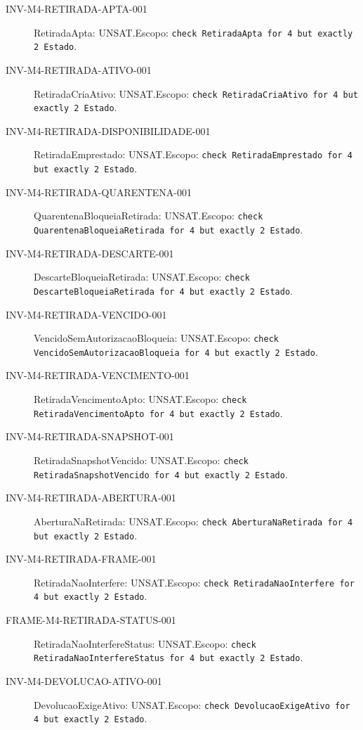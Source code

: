 \begin{description}
\item[INV-M4-RETIRADA-APTA-001] RetiradaApta: UNSAT.\newline Escopo: \texttt{check RetiradaApta for 4 but exactly 2 Estado}.
\item[INV-M4-RETIRADA-ATIVO-001] RetiradaCriaAtivo: UNSAT.\newline Escopo: \texttt{check RetiradaCriaAtivo for 4 but exactly 2 Estado}.
\item[INV-M4-RETIRADA-DISPONIBILIDADE-001] RetiradaEmprestado: UNSAT.\newline Escopo: \texttt{check RetiradaEmprestado for 4 but exactly 2 Estado}.
\item[INV-M4-RETIRADA-QUARENTENA-001] QuarentenaBloqueiaRetirada: UNSAT.\newline Escopo: \texttt{check QuarentenaBloqueiaRetirada for 4 but exactly 2 Estado}.
\item[INV-M4-RETIRADA-DESCARTE-001] DescarteBloqueiaRetirada: UNSAT.\newline Escopo: \texttt{check DescarteBloqueiaRetirada for 4 but exactly 2 Estado}.
\item[INV-M4-RETIRADA-VENCIDO-001] VencidoSemAutorizacaoBloqueia: UNSAT.\newline Escopo: \texttt{check VencidoSemAutorizacaoBloqueia for 4 but exactly 2 Estado}.
\item[INV-M4-RETIRADA-VENCIMENTO-001] RetiradaVencimentoApto: UNSAT.\newline Escopo: \texttt{check RetiradaVencimentoApto for 4 but exactly 2 Estado}.
\item[INV-M4-RETIRADA-SNAPSHOT-001] RetiradaSnapshotVencido: UNSAT.\newline Escopo: \texttt{check RetiradaSnapshotVencido for 4 but exactly 2 Estado}.
\item[INV-M4-RETIRADA-ABERTURA-001] AberturaNaRetirada: UNSAT.\newline Escopo: \texttt{check AberturaNaRetirada for 4 but exactly 2 Estado}.
\item[INV-M4-RETIRADA-FRAME-001] RetiradaNaoInterfere: UNSAT.\newline Escopo: \texttt{check RetiradaNaoInterfere for 4 but exactly 2 Estado}.
\item[FRAME-M4-RETIRADA-STATUS-001] RetiradaNaoInterfereStatus: UNSAT.\newline Escopo: \texttt{check RetiradaNaoInterfereStatus for 4 but exactly 2 Estado}.
\item[INV-M4-DEVOLUCAO-ATIVO-001] DevolucaoExigeAtivo: UNSAT.\newline Escopo: \texttt{check DevolucaoExigeAtivo for 4 but exactly 2 Estado}.

\end{description}
